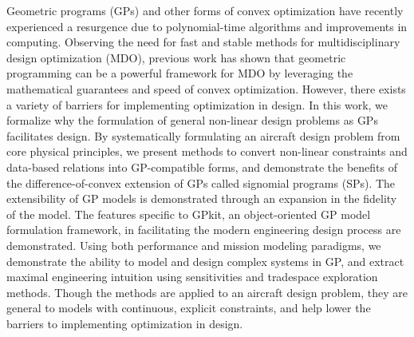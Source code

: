 % 
% 
%


Geometric programs (GPs) and other forms of convex optimization have recently experienced
a resurgence due to polynomial-time algorithms and improvements in computing.
Observing the need for fast and stable methods for multidisciplinary
design optimization (MDO),
previous work has shown that geometric programming can be a powerful framework
for MDO by leveraging the mathematical guarantees
and speed of convex optimization. However, there exists a variety of barriers for
implementing optimization in design. In this work, we formalize why the formulation
of general non-linear design problems as GPs facilitates design. By systematically
formulating an aircraft design problem from core physical principles, we present methods
to convert non-linear constraints and data-based relations into GP-compatible forms,
and demonstrate the benefits of the difference-of-convex extension of
GPs called signomial programs (SPs).
The extensibility of GP models is demonstrated through an expansion
in the fidelity of the model.
The features specific to GPkit, an object-oriented GP model formulation framework, in
facilitating the modern engineering design process are demonstrated.
Using both performance and mission modeling paradigms, we demonstrate the ability to
model and design complex systems in GP, and extract maximal engineering intuition
using sensitivities and tradespace exploration methods.
Though the methods are applied to an aircraft design problem, they are general to
models with continuous, explicit constraints, and help lower the barriers to implementing
optimization in design.

